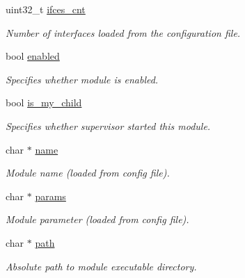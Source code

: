 \begin{DoxyCompactItemize}
uint32\+\_\+t \hyperlink{structmodule__s_a4648ca5376f14c3b1a0aaae2f8ad09eb}{ifces\+\_\+cnt}
\begin{DoxyCompactList}\small\item\em Number of interfaces loaded from the configuration file. \end{DoxyCompactList}\item 
\mbox{\label{structmodule__s_a72c2723d9e035f4f7e4e6c396ce852cb}} 
bool \hyperlink{structmodule__s_a72c2723d9e035f4f7e4e6c396ce852cb}{enabled}
\begin{DoxyCompactList}\small\item\em Specifies whether module is enabled. \end{DoxyCompactList}\item 
\mbox{\label{structmodule__s_a94e748eb373fec16095d64f635a81d58}} 
bool \hyperlink{structmodule__s_a94e748eb373fec16095d64f635a81d58}{is\+\_\+my\+\_\+child}
\begin{DoxyCompactList}\small\item\em Specifies whether supervisor started this module. \end{DoxyCompactList}\item 
\mbox{\label{structmodule__s_a26df008d9f402a9e0adafa188c93e837}} 
char $\ast$ \hyperlink{structmodule__s_a26df008d9f402a9e0adafa188c93e837}{name}
\begin{DoxyCompactList}\small\item\em Module name (loaded from config file). \end{DoxyCompactList}\item 
\mbox{\label{structmodule__s_a917102834c8ddc6f65ac28d83709766c}} 
char $\ast$ \hyperlink{structmodule__s_a917102834c8ddc6f65ac28d83709766c}{params}
\begin{DoxyCompactList}\small\item\em Module parameter (loaded from config file). \end{DoxyCompactList}\item 
\mbox{\label{structmodule__s_ab809eb2ca93ce783f70d48d303d5095c}} 
char $\ast$ \hyperlink{structmodule__s_ab809eb2ca93ce783f70d48d303d5095c}{path}
\begin{DoxyCompactList}\small\item\em Absolute path to module executable directory. \end{DoxyCompactList}\item 

\end{DoxyCompactItemize}
